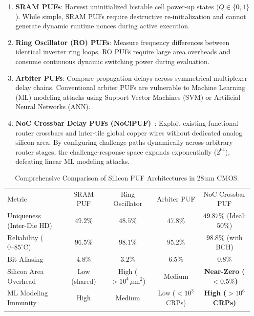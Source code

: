 \begin{enumerate}
    \item \textbf{SRAM PUFs}: Harvest uninitialized bistable cell power-up states ($Q \in \{0, 1\}$). While simple, SRAM PUFs require destructive re-initialization and cannot generate dynamic runtime nonces during active execution.
    \item \textbf{Ring Oscillator (RO) PUFs}: Measure frequency differences between identical inverter ring loops. RO PUFs require large area overheads and consume continuous dynamic switching power during evaluation.
    \item \textbf{Arbiter PUFs}: Compare propagation delays across symmetrical multiplexer delay chains. Conventional arbiter PUFs are vulnerable to Machine Learning (ML) modeling attacks using Support Vector Machines (SVM) or Artificial Neural Networks (ANN).
    \item \textbf{NoC Crossbar Delay PUFs (NoCiPUF)}~\cite{Grover2025PUF}: Exploit existing functional router crossbars and inter-tile global copper wires without dedicated analog silicon area. By configuring challenge paths dynamically across arbitrary router stages, the challenge-response space expands exponentially ($2^{64}$), defeating linear ML modeling attacks.
\end{enumerate}

\begin{table}[t]
\centering
\caption{Comprehensive Comparison of Silicon PUF Architectures in 28\,nm CMOS.}
\label{tab:puf-taxonomy-comparison}
\begin{tabular}{lcccc}
\hline\noalign{\smallskip}
Metric & SRAM PUF & Ring Oscillator & Arbiter PUF & NoC Crossbar PUF \\
\noalign{\smallskip}\svhline\noalign{\smallskip}
Uniqueness (Inter-Die HD) & $49.2\%$ & $48.5\%$ & $47.8\%$ & $\mathbf{49.87\%}$ (Ideal: $50\%$) \\
Reliability ($0\text{--}85^\circ\text{C}$) & $96.5\%$ & $98.1\%$ & $95.2\%$ & $\mathbf{98.8\%}$ (with BCH) \\
Bit Aliasing & $4.8\%$ & $3.2\%$ & $6.5\%$ & $\mathbf{0.8\%}$ \\
Silicon Area Overhead & Low (shared) & High ($>10^4\,\mu\mathrm{m}^2$) & Medium & \textbf{Near-Zero ($<0.5\%$)} \\
ML Modeling Immunity & High & Medium & Low ($<10^3$ CRPs) & \textbf{High ($>10^6$ CRPs)} \\
\noalign{\smallskip}\hline
\end{tabular}
\end{table}

